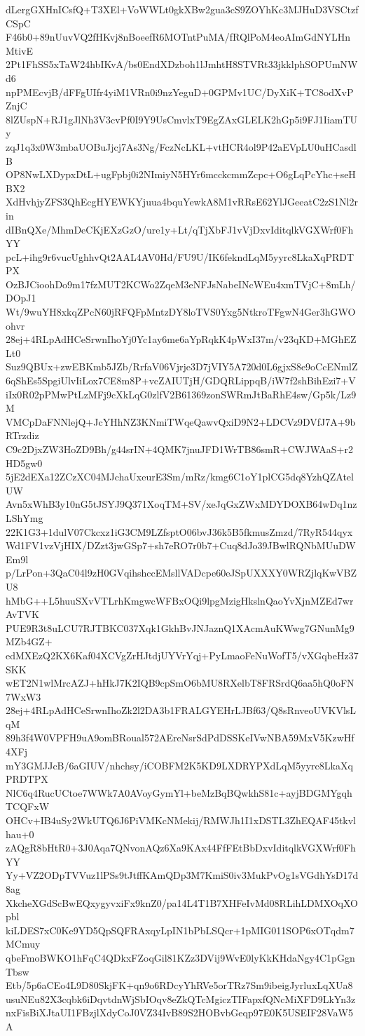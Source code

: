 dLergGXHnICsfQ+T3XEl+VoWWLt0gkXBw2gua3cS9ZOYhKc3MJHuD3VSCtzfCSpC
F46b0+89nUuvVQ2fHKvj8nBoeefR6MOTntPuMA/fRQlPoM4eoAImGdNYLHnMtivE
2Pt1FhSS5xTaW24hbIKvA/bs0EndXDzboh1lJmhtH8STVRt33jkklphSOPUmNWd6
npPMEcvjB/dFFgUIfr4yiM1VRn0i9nzYeguD+0GPMv1UC/DyXiK+TC8odXvPZnjC
8lZUspN+RJ1gJlNh3V3cvPf0I9Y9UsCmvlxT9EgZAxGLELK2hGp5i9FJ1IiamTUy
zqJ1q3x0W3mbaUOBuJjcj7As3Ng/FczNcLKL+vtHCR4ol9P42aEVpLU0uHCasdlB
OP8NwLXDypxDtL+ugFpbj0i2NImiyN5HYr6mcckcmmZcpc+O6gLqPcYhc+seHBX2
XdHvhjyZFS3QhEcgHYEWKYjuua4bquYewkA8M1vRRsE62YlJGeeatC2zS1Nl2rin
dIBnQXe/MhmDeCKjEXzGzO/ure1y+Lt/qTjXbFJ1vVjDxvIditqlkVGXWrf0FhYY
pcL+ihg9r6vucUghhvQt2AAL4AV0Hd/FU9U/IK6fekndLqM5yyrc8LkaXqPRDTPX
OzBJCioohDo9m17fzMUT2KCWo2ZqeM3eNFJsNabeINcWEu4xmTVjC+8mLh/DOpJ1
Wt/9wuYH8xkqZPcN60jRFQFpMntzDY8loTVS0Yxg5NtkroTFgwN4Ger3hGWOohvr
28ej+4RLpAdHCeSrwnIhoYj0Yc1ay6me6aYpRqkK4pWxI37m/v23qKD+MGhEZLt0
Suz9QBUx+zwEBKmb5JZb/RrfaV06Vjrje3D7jVIY5A720d0L6gjxS8e9oCcENmlZ
6qShEs5SpgiUlvIiLox7CE8m8P+vcZAIUTjH/GDQRLippqB/iW7f2shBihEzi7+V
iIx0R02pPMwPtLzMFj9cXkLqG0zlfV2B61369zonSWRmJtBaRhE4sw/Gp5k/Lz9M
VMCpDaFNNlejQ+JcYHhNZ3KNmiTWqeQawvQxiD9N2+LDCVz9DVfJ7A+9bRTrzdiz
C9c2DjxZW3HoZD9Bh/g44srIN+4QMK7jnuJFD1WrTB86smR+CWJWAaS+r2HD5gw0
5jE2dEXa12ZCzXC04MJchaUxeurE3Sm/mRz/kmg6C1oY1plCG5dq8YzhQZAtelUW
Avn5xWhB3y10nG5tJSYJ9Q371XoqTM+SV/xeJqGxZWxMDYDOXB64wDq1nzLShYmg
22K1G3+1dulV07Ckcxz1iG3CM9LZfsptO06bvJ36k5B5fkmusZmzd/7RyR544qyx
Wd1FV1vzVjHIX/DZzt3jwGSp7+sh7eRO7r0b7+Cuq8dJo39JBwlRQNbMUuDWEm9l
p/LrPon+3QaC04l9zH0GVqihshccEMsllVADcpe60eJSpUXXXY0WRZjlqKwVBZU8
hMbG++L5huuSXvVTLrhKmgwcWFBxOQi9lpgMzigHkslnQaoYvXjnMZEd7wrAvTVK
PUE9R3t8uLCU7RJTBKC037Xqk1GkhBvJNJaznQ1XAcmAuKWwg7GNunMg9MZb4GZ+
edMXEzQ2KX6Kaf04XCVgZrHJtdjUYVrYqj+PyLmaoFeNuWofT5/vXGqbeHz37SKK
wET2N1wlMrcAZJ+hHkJ7K2IQB9cpSmO6bMU8RXelbT8FRSrdQ6aa5hQ0oFN7WxW3
28ej+4RLpAdHCeSrwnIhoZk2l2DA3b1FRALGYEHrLJBf63/Q8sRnveoUVKVlsLqM
89h3f4W0VPFH9uA9omBRoual572AEreNsrSdPdDSSKeIVwNBA59MxV5KzwHf4XFj
mY3GMJJcB/6aGIUV/nhchsy/iCOBFM2K5KD9LXDRYPXdLqM5yyrc8LkaXqPRDTPX
NlC6q4RucUCtoe7WWk7A0AVoyGymYl+beMzBqBQwkhS81c+ayjBDGMYgqhTCQFxW
OHCv+IB4uSy2WkUTQ6J6PiVMKcNMekij/RMWJh1I1xDSTL3ZhEQAF45tkvlhau+0
zAQgR8bHtR0+3J0Aqa7QNvonAQz6Xa9KAx44FfFEtBbDxvIditqlkVGXWrf0FhYY
Yy+VZ2ODpTVVuz1lPSs9tJtffKAmQDp3M7KmiS0iv3MukPvOg1sVGdhYsD17d8ag
XkcheXGdScBwEQxygyvxiFx9knZ0/pa14L4T1B7XHFeIvMd08RLihLDMXOqXOpbl
kiLDES7xC0Ke9YD5QpSQFRAxqyLpIN1bPbLSQcr+1pMIG011SOP6xOTqdm7MCmuy
qbeFmoBWKO1hFqC4QDkxFZoqGil81KZz3DVij9WvE0lyKkKHdaNgy4C1pGgnTbsw
Etb/5p6aCEo4L9D80SkjFK+qn9o6RDcyYhRVe5orTRz7Sm9ibeigJyrluxLqXUa8
usuNEu82X3cqbk6iDqvtdnWjSbIOqv8eZkQTcMgiczTIFapxfQNcMiXFD9LkYn3z
nxFisBiXJtaUI1FBzjlXdyCoJ0VZ34IvB89S2HOBvbGeqp97E0K5USEIF28VaW5A
